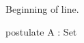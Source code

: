 \documentclass{article}
\begin{document}
\noindent Beginning of line.
\begin{code}
  postulate A : Set
\end{code}
\end{document}

